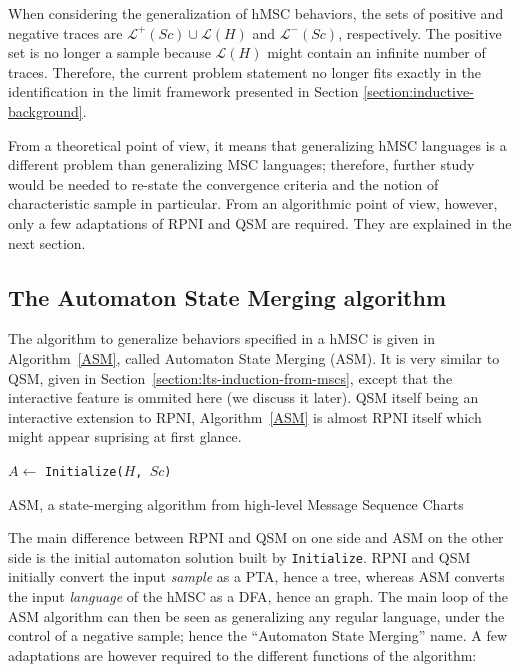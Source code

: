 When considering the generalization of hMSC behaviors, the sets of positive and negative traces are $\mathcal{L}^+(Sc) \cup \mathcal{L}(H)$ and $\mathcal{L}^-(Sc)$, respectively. The positive set is no longer a sample because $\mathcal{L}(H)$ might contain an infinite number of traces. Therefore, the current problem statement no longer fits exactly in the identification in the limit framework presented in Section \ref{section:inductive-background}. 

From a theoretical point of view, it means that generalizing hMSC languages is a different problem than generalizing MSC languages; therefore, further study would be needed to re-state the convergence criteria and the notion of characteristic sample in particular. From an algorithmic point of view, however, only a few adaptations of RPNI and QSM are required. They are explained in the next section.

\subsection{The Automaton State Merging algorithm\label{subsection:automaton-state-merging}}

The algorithm to generalize behaviors specified in a hMSC is given in Algorithm~\ref{ASM}, called Automaton State Merging (ASM). It is very similar to QSM, given in Section~\ref{section:lts-induction-from-mscs}, except that the interactive feature is ommited here (we discuss it later). QSM itself being an interactive extension to RPNI, Algorithm~\ref{ASM} is almost RPNI itself which might appear suprising at first glance.

\begin{algorithm}
{
\vspace{0.2cm}

$A \leftarrow $ {\tt Initialize($H$, $Sc$)}\\
}
\vspace{0.2cm}
\caption{\textsc{ASM}, a state-merging algorithm from high-level Message Sequence Charts\label{ASM}}
\end{algorithm}

The main difference between RPNI and QSM on one side and ASM on the other side is the initial automaton solution built by \texttt{Initialize}. RPNI and QSM initially convert the input \emph{sample} as a PTA, hence a tree, whereas ASM converts the input \emph{language} of the hMSC as a DFA, hence an graph. The main loop of the ASM algorithm can then be seen as generalizing any regular language, under the control of a negative sample; hence the ``Automaton State Merging'' name. A few adaptations are however required to the different functions of the algorithm: 

